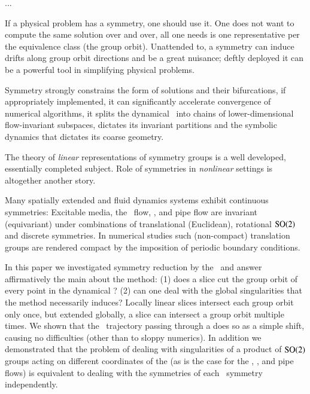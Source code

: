 
\ifboyscout
	...
\fi

If a physical problem has a symmetry, one should use it.
One does not want to compute the same solution over and over, all
one needs is one representative per the equivalence class (the group orbit).
Unattended to, a symmetry can induce drifts along group orbit directions
and be a great nuisance; deftly deployed
it can be a powerful tool in simplifying physical problems.

Symmetry strongly constrains the form of solutions and their bifurcations,
if appropriately implemented, it can significantly accelerate
convergence of numerical algorithms,
it splits the dynamical \statesp\ into chains of lower-dimensional flow-invariant
subspaces, dictates its invariant partitions and the symbolic dynamics that dictates its coarse geometry.

The theory of \emph{linear} representations of symmetry groups is
a well developed, essentially completed subject. Role of symmetries in
\emph{nonlinear} settings is altogether another story.

Many spatially extended and fluid dynamics systems exhibit continuous
symmetries: Excitable
media, the \KS\
flow, {\pCf}, and
pipe flow\rf{Wk04,Kerswell05} are invariant (equivariant) under
combinations of translational (Euclidean), rotational $\textrm{SO}(2)$ and
discrete symmetries. In numerical studies such (non-compact) translation
groups are rendered compact by the imposition of periodic boundary
conditions.

In this paper we investigated symmetry reduction by the
\mslices\ and answer affirmatively the main about the method:
(1) does a slice cut the group orbit of every point in the dynamical \statesp?
(2) can one deal with the global singularities that the method necessarily
induces? Locally linear slices intersect each group orbit only once,
but extended globally, a slice can intersect a group orbit multiple times.
We shown that the \reducedsp\ trajectory
passing through a {\sset} does so as a simple shift,
causing no difficulties (other than to sloppy numerics). In addition we
demonstrated that the problem of dealing with singularities of a product
of $\textrm{SO}(2)$ groups acting on different coordinates of the {\statesp}
(as is the case for the \KS\rf{ku,siv},
{\pCf}, and
pipe flows) is equivalent to dealing with the
symmetries of each \SOn{2}\ symmetry independently.

